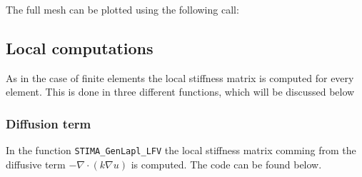 The full mesh can be plotted using the following call: \\

 


\subsection{Local computations}

As in the case of finite elements the local stiffness matrix is computed for every element. This is done in three different functions, which will be discussed below

\subsubsection{Diffusion term}

In the function \texttt{STIMA\_GenLapl\_LFV} the local stiffness matrix comming from the diffusive term $-\nabla\cdot(k\nabla u)$ is computed. The code can be found below.


